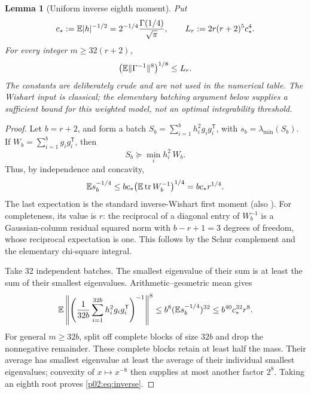 \documentclass[11pt]{article}
\numberwithin{equation}{section}
\newtheorem{lemma}[theorem]{Lemma}
\theoremstyle{definition}\newtheorem{definition}[theorem]{Definition}
\theoremstyle{remark}\newtheorem{remark}[theorem]{Remark}
\newcommand{\tr}{\operatorname{tr}}\newcommand{\Ent}{\operatorname{Ent}}
\newcommand{\norm}[1]{\lVert#1\rVert}\newcommand{\ip}[2]{\langle#1,#2\rangle}
\begin{document}
\begin{lemma}[Uniform inverse eighth moment]\label{p02:lem:inverse}
Put
\[
 c_*:=\mathbb E|h|^{-1/2}=2^{-1/4}\frac{\Gamma(1/4)}{\sqrt\pi},\qquad
 L_r:=2r(r+2)^5c_*^4.
\]
For every integer \(m\ge32(r+2)\),
\begin{equation}\label{p02:eq:inverse}
 \bigl(\E\norm{\Gamma^{-1}}^8\bigr)^{1/8}\le L_r.
\end{equation}
The constants are deliberately crude and are not used in the numerical table.
The Wishart input is classical; the elementary batching argument below supplies
a sufficient bound for this weighted model, not an optimal integrability threshold.
\end{lemma}
\begin{proof}
Let \(b=r+2\), and form a batch \(S_b=\sum_{i=1}^b h_i^2g_ig_i^{\mathsf T}\), with \(s_b=\lambda_{\min}(S_b)\). If \(W_b=\sum_{i=1}^b g_ig_i^{\mathsf T}\), then
\[
 S_b\succeq\min_i h_i^2\,W_b.
\]
Thus, by independence and concavity,
\[
 \E s_b^{-1/4}
 \le b c_*\bigl(\E\tr W_b^{-1}\bigr)^{1/4}
 =b c_*r^{1/4}.
\]
The last expectation is the standard inverse-Wishart first moment
\cite[Proposition~10.2]{HMT} (also \cite[Fact~5.3]{EW}).
For completeness, its value is \(r\): the reciprocal of a diagonal entry of \(W_b^{-1}\) is a Gaussian-column residual squared norm with \(b-r+1=3\) degrees of freedom, whose reciprocal expectation is one. This follows by the Schur complement and the elementary chi-square integral.

Take 32 independent batches. The smallest eigenvalue of their sum is at least the sum of their smallest eigenvalues. Arithmetic--geometric mean gives
\[
 \mathbb E\left\|\left(\frac1{32b}\sum_{i=1}^{32b}h_i^2g_ig_i^{\mathsf T}\right)^{-1}\right\|^8
 \le b^8(\mathbb E s_b^{-1/4})^{32}
 \le b^{40}c_*^{32}r^8.
\]
For general \(m\ge32b\), split off complete blocks of size \(32b\) and drop the nonnegative remainder. These complete blocks retain at least half the mass. Their average has smallest eigenvalue at least the average of their individual smallest eigenvalues; convexity of \(x\mapsto x^{-8}\) then supplies at most another factor \(2^8\). Taking an eighth root proves \eqref{p02:eq:inverse}.
\end{proof}
\end{document}
